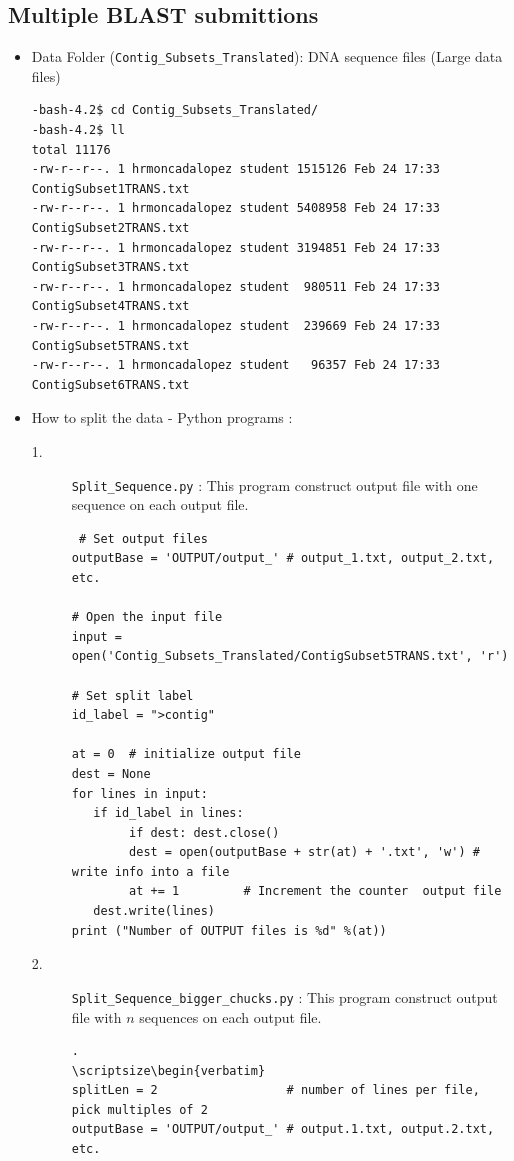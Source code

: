 \documentclass{article}
\begin{document}
\subsection{Multiple BLAST submittions}
\begin{itemize}
\item Data Folder (\verb+Contig_Subsets_Translated+): DNA sequence files (Large data files)
\scriptsize\begin{verbatim}
-bash-4.2$ cd Contig_Subsets_Translated/
-bash-4.2$ ll
total 11176
-rw-r--r--. 1 hrmoncadalopez student 1515126 Feb 24 17:33 ContigSubset1TRANS.txt
-rw-r--r--. 1 hrmoncadalopez student 5408958 Feb 24 17:33 ContigSubset2TRANS.txt
-rw-r--r--. 1 hrmoncadalopez student 3194851 Feb 24 17:33 ContigSubset3TRANS.txt
-rw-r--r--. 1 hrmoncadalopez student  980511 Feb 24 17:33 ContigSubset4TRANS.txt
-rw-r--r--. 1 hrmoncadalopez student  239669 Feb 24 17:33 ContigSubset5TRANS.txt
-rw-r--r--. 1 hrmoncadalopez student   96357 Feb 24 17:33 ContigSubset6TRANS.txt
\end{verbatim}
\normalsize
\item How to split the data - Python programs : 
\begin{description}
\item [1.] \verb+Split_Sequence.py+ : This program construct output file with one sequence on each output file.
\scriptsize\begin{verbatim}
 # Set output files
outputBase = 'OUTPUT/output_' # output_1.txt, output_2.txt, etc.

# Open the input file 
input = open('Contig_Subsets_Translated/ContigSubset5TRANS.txt', 'r')

# Set split label
id_label = ">contig"

at = 0  # initialize output file
dest = None
for lines in input:
   if id_label in lines:
        if dest: dest.close()
        dest = open(outputBase + str(at) + '.txt', 'w') # write info into a file
        at += 1         # Increment the counter  output file
   dest.write(lines)
print ("Number of OUTPUT files is %d" %(at))
\end{verbatim}
\normalsize
\item [2.] \verb+Split_Sequence_bigger_chucks.py+ : This program construct output file with $n$ sequences on each output file.
\scriptsize\begin{verbatim}.
\scriptsize\begin{verbatim}
splitLen = 2                  # number of lines per file, pick multiples of 2
outputBase = 'OUTPUT/output_' # output.1.txt, output.2.txt, etc.


\end{verbatim}
\end{description}
\end{itemize}
\end{document}
